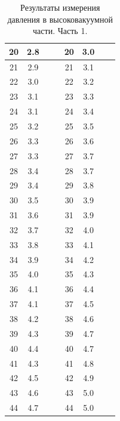 \documentclass[a4paper,12pt]{article}
\begin{document}
\begin{table}[!ht]
{\begin{tabular}{|c|c||c|c||c|c||c|c|}
        20 & 2.8 &    &      & 20 & 3.0 &    &      \\ \hline
        21 & 2.9 &    &      & 21 & 3.1 &    &      \\ \hline
        22 & 3.0 &    &      & 22 & 3.2 &    &      \\ \hline
        23 & 3.1 &    &      & 23 & 3.3 &    &      \\ \hline
        24 & 3.1 &    &      & 24 & 3.4 &    &      \\ \hline
        25 & 3.2 &    &      & 25 & 3.5 &    &      \\ \hline
        26 & 3.3 &    &      & 26 & 3.6 &    &      \\ \hline
        27 & 3.3 &    &      & 27 & 3.7 &    &      \\ \hline
        28 & 3.4 &    &      & 28 & 3.7 &    &      \\ \hline
        29 & 3.4 &    &      & 29 & 3.8 &    &      \\ \hline
        30 & 3.5 &    &      & 30 & 3.9 &    &      \\ \hline
        31 & 3.6 &    &      & 31 & 3.9 &    &      \\ \hline
        32 & 3.7 &    &      & 32 & 4.0 &    &      \\ \hline
        33 & 3.8 &    &      & 33 & 4.1 &    &      \\ \hline
        34 & 3.9 &    &      & 34 & 4.2 &    &      \\ \hline
        35 & 4.0 &    &      & 35 & 4.3 &    &      \\ \hline
        36 & 4.1 &    &      & 36 & 4.4 &    &      \\ \hline
        37 & 4.1 &    &      & 37 & 4.5 &    &      \\ \hline
        38 & 4.2 &    &      & 38 & 4.6 &    &      \\ \hline
        39 & 4.3 &    &      & 39 & 4.7 &    &      \\ \hline
        40 & 4.4 &    &      & 40 & 4.7 &    &      \\ \hline
        41 & 4.3 &    &      & 41 & 4.8 &    &      \\ \hline
        42 & 4.5 &    &      & 42 & 4.9 &    &      \\ \hline
        43 & 4.6 &    &      & 43 & 5.0 &    &      \\ \hline
        44 & 4.7 &    &      & 44 & 5.0 &    &      \\ \hline
    \end{tabular}}
    \caption{Результаты измерения давления в высоковакуумной части. Часть 1.}
\end{table}
\end{document}

